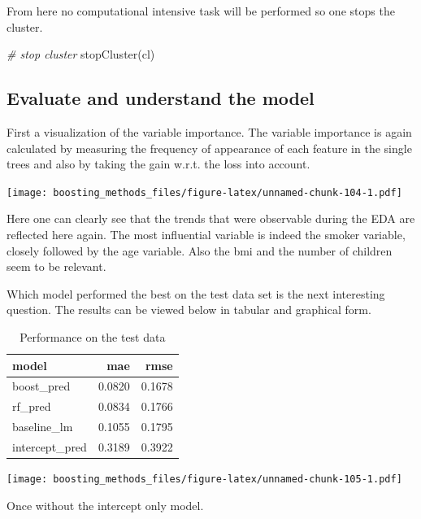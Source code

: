 \documentclass[
]{book}
\newenvironment{Shaded}{\begin{snugshade}}{\end{snugshade}}
\newcommand{\CommentTok}[1]{\textcolor[rgb]{0.56,0.35,0.01}{\textit{#1}}}
\newcommand{\FunctionTok}[1]{\textcolor[rgb]{0.00,0.00,0.00}{#1}}
\newcommand{\NormalTok}[1]{#1}
\begin{document}
From here no computational intensive task will be performed so one stops the cluster.

\begin{Shaded}
\begin{Highlighting}[]
\CommentTok{\# stop cluster}
\FunctionTok{stopCluster}\NormalTok{(cl)}
\end{Highlighting}
\end{Shaded}

\hypertarget{evaluate-and-understand-the-model-1}{%
\subsection{Evaluate and understand the model}\label{evaluate-and-understand-the-model-1}}

First a visualization of the variable importance. The variable importance is again calculated by measuring the frequency of appearance of each feature in the single trees and also by taking the gain w.r.t. the loss into account.

\texttt{[image: boosting\_methods\_files/figure-latex/unnamed-chunk-104-1.pdf]}

Here one can clearly see that the trends that were observable during the EDA are reflected here again. The most influential variable is indeed the smoker variable, closely followed by the age variable. Also the bmi and the number of children seem to be relevant.

Which model performed the best on the test data set is the next interesting question. The results can be viewed below in tabular and graphical form.

\begin{table}

\caption{\label{tab:perfIns}Performance on the test data}
\centering
\begin{tabular}[t]{lrr}
\toprule
model & mae & rmse\\
\midrule
boost\_pred & 0.0820 & 0.1678\\
rf\_pred & 0.0834 & 0.1766\\
baseline\_lm & 0.1055 & 0.1795\\
intercept\_pred & 0.3189 & 0.3922\\
\bottomrule
\end{tabular}
\end{table}

\texttt{[image: boosting\_methods\_files/figure-latex/unnamed-chunk-105-1.pdf]}

Once without the intercept only model.
\end{document}
